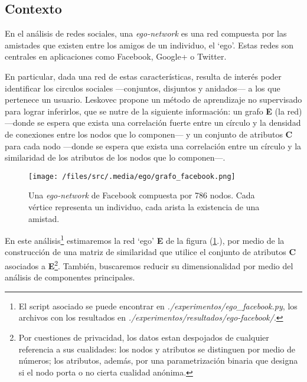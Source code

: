 
\vspace{2em}
\subsection{Contexto} 

En el análisis de redes sociales, una \textit{ego-network} \cite{Leskovec} es una red compuesta por las amistades que existen entre los amigos de un individuo, el `ego'. Estas redes son centrales en aplicaciones como Facebook, Google+ o Twitter. 

\vspace{1em}
En particular, dada una red de estas características, resulta de interés poder identificar los circulos sociales ---conjuntos, disjuntos y anidados--- a los que pertenece un usuario. Leskovec \cite{Leskovec} propone un método de aprendizaje no supervisado para lograr inferirlos, que se nutre de la siguiente información: un grafo \textbf{E} (la red) ---donde se espera que exista una correlación fuerte entre un círculo y la densidad de conexiones entre los nodos que lo componen--- y un conjunto de atributos \textbf{C} para cada nodo ---donde se espera que exista una correlación entre un círculo y la similaridad de los atributos de los nodos que lo componen---.

\vspace{1em}
\begin{figure}[!htbp]
\texttt{[image: /files/src/.media/ego/grafo\_facebook.png]}
\caption{Una \textit{ego-network} de Facebook compuesta por 786 nodos. Cada vértice representa un individuo, cada arista la existencia de una amistad.} \label{ego_facebook}
\end{figure}

\vspace{1em}
En este análisis\footnote{El script asociado se puede encontrar en \textit{./experimentos/ego\_facebook.py}, los archivos con los resultados  en \textit{./experimentos/resultados/ego-facebook/}.} estimaremos la red `ego' \textbf{E} de la figura (\ref{ego_facebook}.), por medio de la construcción de una matriz de similaridad que utilice el conjunto de atributos \textbf{C} asociados a \textbf{E}\footnote{Por cuestiones de privacidad, los datos estan despojados de cualquier referencia a sus cualidades: los nodos y atributos se distinguen por medio de números; los atributos, además, por una parametrización binaria que designa si el nodo porta o no cierta cualidad anónima.}. También, buscaremos reducir su dimensionalidad por medio del análisis de componentes principales.




